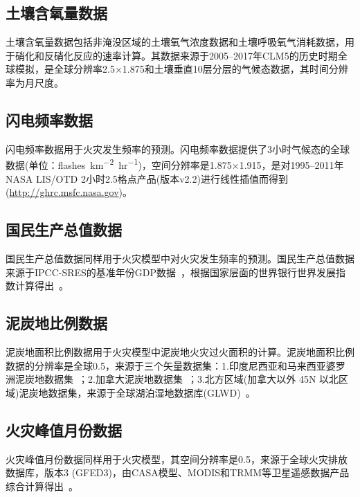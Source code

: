 \subsection{土壤含氧量数据}\label{土壤含氧量数据}
土壤含氧量数据包括非淹没区域的土壤氧气浓度数据和土壤呼吸氧气消耗数据，用于硝化和反硝化反应的速率计算。其数据来源于2005--2017年CLM5的历史时期全球模拟，是全球分辨率2.5\textdegree$\times$1.875\textdegree 和土壤垂直10层分层的气候态数据，其时间分辨率为月尺度。


\subsection{闪电频率数据}\label{闪电频率数据}
闪电频率数据用于火灾发生频率的预测。闪电频率数据提供了3小时气候态的全球数据(单位：\unit{flashes. km^{-2}.hr^{-1}})，空间分辨率是1.875\textdegree$\times$1.915\textdegree，是对1995--2011年NASA LIS/OTD 2小时2.5\textdegree{}格点产品(版本v2.2)进行线性插值而得到(\url{http://ghrc.msfc.nasa.gov})。


\subsection{国民生产总值数据}\label{国民生产总值数据}
国民生产总值数据同样用于火灾模型中对火灾发生频率的预测。国民生产总值数据来源于IPCC-SRES的基准年份GDP数据~\citep{van2007downscaling}，根据国家层面的世界银行世界发展指数计算得出~\citep{WorldBank2004,UNSTAT2005}。


\subsection{泥炭地比例数据}\label{泥炭地比例数据}
泥炭地面积比例数据用于火灾模型中泥炭地火灾过火面积的计算。泥炭地面积比例数据的分辨率是全球0.5\textdegree，来源于三个矢量数据集：1.印度尼西亚和马来西亚婆罗洲泥炭地数据集~\citep{olson2001terrestrial}；2.加拿大泥炭地数据集~\citep{tarnocai2000peatlands}；3.北方区域(加拿大以外 45\textdegree N 以北区域)泥炭地数据集，来源于全球湖泊湿地数据库(GLWD)~\citep{lehner2004development}。


\subsection{火灾峰值月份数据}\label{火灾峰值月份数据}
火灾峰值月份数据同样用于火灾模型，其空间分辨率是0.5\textdegree，来源于全球火灾排放数据库，版本3 (GFED3)，由CASA模型、MODIS和TRMM等卫星遥感数据产品综合计算得出~\citep{van2010global}。


